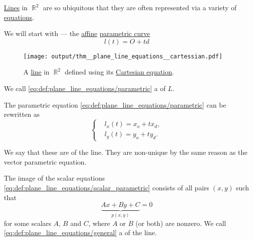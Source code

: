 \begin{definition}\label{def:plane_line_equations}
  \hyperref[def:affine_line]{Lines} in \( \BbbR^2 \) are so ubiquitous that they are often represented via a variety of \hyperref[ex:equations]{equations}.

  We will start with  --- the \hyperref[def:affine_operator]{affine} \hyperref[def:parametric_curve]{parametric curve}
  \begin{equation}\label{eq:def:plane_line_equations/parametric}
    l(t) = O + td
  \end{equation}

  \begin{figure}[!ht]
    \centering
    \texttt{[image: output/thm\_\_plane\_line\_equations\_\_cartessian.pdf]}
    \caption{A \hyperref[def:affine_line]{line} in \( \BbbR^2 \) defined using its \hyperref[def:plane_line_equations/cartesian]{Cartesian equation}.}\label{fig:def:plane_line_equations/cartesian}
  \end{figure}

  \begin{thmenum}
     We call \eqref{eq:def:plane_line_equations/parametric} a  of \( L \).

    \medspace

     The parametric equation \eqref{eq:def:plane_line_equations/parametric} can be rewritten as
    \begin{equation}\label{eq:def:plane_line_equations/scalar_parametric}
      \begin{cases}
         &l_x(t) = x_o + t x_d, \\
         &l_y(t) = y_o + t y_d.
      \end{cases}
    \end{equation}

    We say that these are  of the line. They are non-unique by the same reason as the vector parametric equation.

     The image of the scalar equations \eqref{eq:def:plane_line_equations/scalar_parametric} consists of all pairs \( (x, y) \) such that
    \begin{equation}\label{eq:def:plane_line_equations/general}
      \underbrace{ Ax + By + C }_{ p(x, y) } = 0
    \end{equation}
    for some scalars \( A \), \( B \) and \( C \), where \( A \) or \( B \) (or both) are nonzero.
    We call \eqref{eq:def:plane_line_equations/general} a  of the line.


\end{thmenum}
\end{definition}
